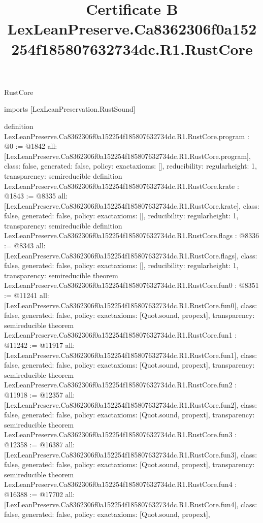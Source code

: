 \begin{lexlean}{RustCore}
\title{Certificate B LexLeanPreserve.Ca8362306f0a152254f185807632734dc.R1.RustCore}
\begin{coremodule}
imports [LexLeanPreservation.RustSound]

definition LexLeanPreserve.Ca8362306f0a152254f185807632734dc.R1.RustCore.program : @0 := @1842 {
  all: [LexLeanPreserve.Ca8362306f0a152254f185807632734dc.R1.RustCore.program],
  class: false,
  generated: false,
  policy: exact{axioms: []},
  reducibility: regular{height: 1},
  transparency: semireducible
}
definition LexLeanPreserve.Ca8362306f0a152254f185807632734dc.R1.RustCore.krate : @1843 := @8335 {
  all: [LexLeanPreserve.Ca8362306f0a152254f185807632734dc.R1.RustCore.krate],
  class: false,
  generated: false,
  policy: exact{axioms: []},
  reducibility: regular{height: 1},
  transparency: semireducible
}
definition LexLeanPreserve.Ca8362306f0a152254f185807632734dc.R1.RustCore.flags : @8336 := @8343 {
  all: [LexLeanPreserve.Ca8362306f0a152254f185807632734dc.R1.RustCore.flags],
  class: false,
  generated: false,
  policy: exact{axioms: []},
  reducibility: regular{height: 1},
  transparency: semireducible
}
theorem LexLeanPreserve.Ca8362306f0a152254f185807632734dc.R1.RustCore.fun0 : @8351 := @11241 {
  all: [LexLeanPreserve.Ca8362306f0a152254f185807632734dc.R1.RustCore.fun0],
  class: false,
  generated: false,
  policy: exact{axioms: [Quot.sound, propext]},
  transparency: semireducible
}
theorem LexLeanPreserve.Ca8362306f0a152254f185807632734dc.R1.RustCore.fun1 : @11242 := @11917 {
  all: [LexLeanPreserve.Ca8362306f0a152254f185807632734dc.R1.RustCore.fun1],
  class: false,
  generated: false,
  policy: exact{axioms: [Quot.sound, propext]},
  transparency: semireducible
}
theorem LexLeanPreserve.Ca8362306f0a152254f185807632734dc.R1.RustCore.fun2 : @11918 := @12357 {
  all: [LexLeanPreserve.Ca8362306f0a152254f185807632734dc.R1.RustCore.fun2],
  class: false,
  generated: false,
  policy: exact{axioms: [Quot.sound, propext]},
  transparency: semireducible
}
theorem LexLeanPreserve.Ca8362306f0a152254f185807632734dc.R1.RustCore.fun3 : @12358 := @16387 {
  all: [LexLeanPreserve.Ca8362306f0a152254f185807632734dc.R1.RustCore.fun3],
  class: false,
  generated: false,
  policy: exact{axioms: [Quot.sound, propext]},
  transparency: semireducible
}
theorem LexLeanPreserve.Ca8362306f0a152254f185807632734dc.R1.RustCore.fun4 : @16388 := @17702 {
  all: [LexLeanPreserve.Ca8362306f0a152254f185807632734dc.R1.RustCore.fun4],
  class: false,
  generated: false,
  policy: exact{axioms: [Quot.sound, propext]},
}
\end{coremodule}
\end{lexlean}
